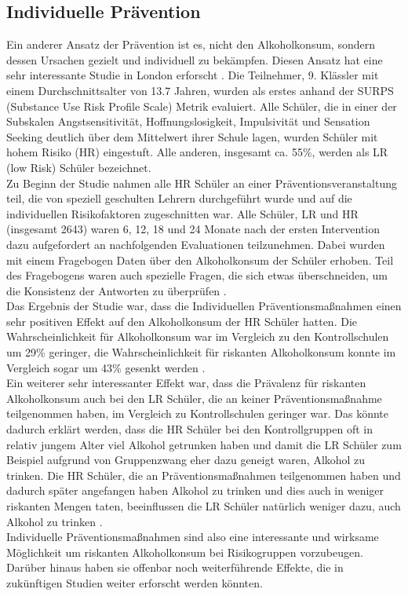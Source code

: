 \documentclass[12pt]{article}
\begin{document}
\subsection{Individuelle Prävention}
Ein anderer Ansatz der Prävention ist es, nicht den Alkoholkonsum, sondern dessen Ursachen gezielt und individuell zu bekämpfen. Diesen Ansatz hat eine sehr interessante Studie in London erforscht \autocite{conrod_effectiveness_2013}. Die Teilnehmer, 9. Klässler mit einem Durchschnittsalter von 13.7 Jahren, wurden als erstes anhand der SURPS (Substance Use Risk Profile Scale) Metrik evaluiert.%
Alle Schüler, die in einer der Subskalen Angstsensitivität, Hoffnungslosigkeit, Impulsivität und Sensation Seeking deutlich über dem Mittelwert ihrer Schule lagen, wurden Schüler mit hohem Risiko (HR) eingestuft. Alle anderen, insgesamt ca. 55\%, werden als LR (low Risk) Schüler bezeichnet.\\
Zu Beginn der Studie nahmen alle HR Schüler an einer Präventionsveranstaltung teil, die von speziell geschulten Lehrern durchgeführt wurde und auf die individuellen Risikofaktoren zugeschnitten war. %
Alle Schüler, LR und HR (insgesamt 2643) waren 6, 12, 18 und 24 Monate nach der ersten Intervention dazu aufgefordert an nachfolgenden Evaluationen teilzunehmen. Dabei wurden mit einem Fragebogen Daten über den Alkoholkonsum der Schüler erhoben. Teil des Fragebogens waren auch spezielle Fragen, die sich etwas überschneiden, um die Konsistenz der Antworten zu überprüfen \autocite[335]{conrod_effectiveness_2013}.\\%
Das Ergebnis der Studie war, dass die Individuellen Präventionsmaßnahmen einen sehr positiven Effekt auf den Alkoholkonsum der HR Schüler hatten. Die Wahrscheinlichkeit für Alkoholkonsum war im Vergleich zu den Kontrollschulen um 29\% geringer, die Wahrscheinlichkeit für riskanten Alkoholkonsum konnte im Vergleich sogar um 43\% gesenkt werden \autocite[339]{conrod_effectiveness_2013}.\\
Ein weiterer sehr interessanter Effekt war, dass die Prävalenz für riskanten Alkoholkonsum auch bei den LR Schüler, die an keiner Präventionsmaßnahme teilgenommen haben, im Vergleich zu Kontrollschulen geringer war. Das könnte dadurch erklärt werden, dass die HR Schüler bei den Kontrollgruppen oft in relativ jungem Alter viel Alkohol getrunken haben und damit die LR Schüler zum Beispiel aufgrund von Gruppenzwang eher dazu geneigt waren, Alkohol zu trinken. Die HR Schüler, die an Präventionsmaßnahmen teilgenommen haben und dadurch später angefangen haben Alkohol zu trinken und dies auch in weniger riskanten Mengen taten, beeinflussen die LR Schüler natürlich weniger dazu, auch Alkohol zu trinken \autocite[340]{conrod_effectiveness_2013}.\\
Individuelle Präventionsmaßnahmen sind also eine interessante und wirksame Möglichkeit um riskanten Alkoholkonsum bei Risikogruppen vorzubeugen. Darüber hinaus haben sie offenbar noch weiterführende Effekte, die in zukünftigen Studien weiter erforscht werden könnten.
\end{document}
